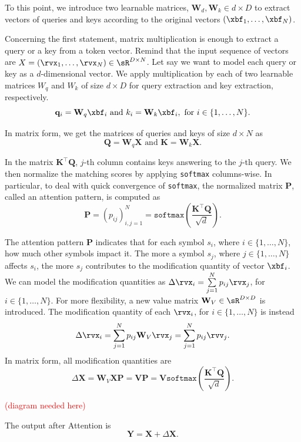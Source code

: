 To this point, we introduce two learnable matrices, $\mathbf{W}_d, \mathbf{W}_k\in d\times D$ to extract vectors of queries and keys according to the original vectors $(\xbf_1,\ldots,\xbf_N)$.

Concerning the first statement, matrix multiplication is enough to extract a query or a key from a token vector. Remind that the input sequence of vectors are $X=(\rvx_1,\ldots,\rvx_N)\in\sR^{D\times N}$. Let say we want to model each query or key as a $d$-dimensional vector. We apply multiplication by each of two learnable matrices $W_q$ and $W_k$ of size $d\times D$ for query extraction and key extraction, respectively.
$$\mathbf{q}_i = \mathbf{W}_q\xbf_i \text{ and } k_i = \mathbf{W}_k\xbf_i, \text{ for } i \in \{1,\ldots, N\}.$$

In matrix form, we get the matrices of queries and keys of size $d\times N$ as
$$\mathbf{Q} = \mathbf{W}_q\mathbf{X} \text{ and } \mathbf{K} = \mathbf{W}_k\mathbf{X}.$$

In the matrix $\mathbf{K}^\top \mathbf{Q}$, $j$-th column contains keys answering to the $j$-th query. We then normalize the matching scores by applying \texttt{softmax} columns-wise. In particular, to deal with quick convergence of \texttt{softmax}, the normalized matrix $\mathbf{P}$, called  an attention pattern, is computed as
$$\mathbf{P}=(p_{ij})_{i,j=1}^N=\texttt{softmax}\left(\dfrac{\mathbf{K}^\top \mathbf{Q}}{\sqrt{d}}\right).$$

The attention pattern $\mathbf{P}$ indicates that for each symbol $s_i$, where $i\in\{1,\ldots, N\}$, how much other symbols impact it. The more a symbol $s_j$, where $j\in\{1,\ldots, N\}$ affects $s_i$, the more $s_j$ contributes to the modification quantity of vector $\xbf_i$. We can model the modification quantities as
$\Delta \rvx_i = \sum\limits_{j=1}^N p_{ij}\rvx_j$, for $i\in\{1,\ldots,N\}$. For more flexibility, a new value matrix $\mathbf{W}_V\in\sR^{D\times D}$ is introduced. The modification quantity of each $\rvx_i$, for $i\in\{1,\ldots, N\}$ is instead
$$\Delta \rvx_i = \sum\limits_{j=1}^N p_{ij}\mathbf{W}_V\rvx_j = \sum\limits_{j=1}^N p_{ij}\rvv_j.$$
In matrix form, all modification quantities are
$$\Delta \mathbf{X} = \mathbf{W}_V \mathbf{X} \mathbf{P}  = \mathbf{V}\mathbf{P} = \mathbf{V}\texttt{softmax}\left(\dfrac{\mathbf{K}^\top \mathbf{Q}}{\sqrt{d}}\right).$$

\textcolor{red}{(diagram needed here)}

The output after Attention is
$$\mathbf{Y} = \mathbf{X} + \Delta \mathbf{X}.$$

